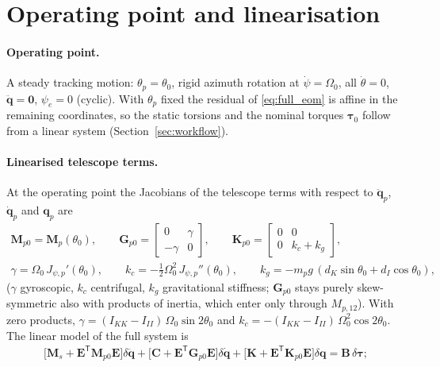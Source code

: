 \documentclass[10pt,a4paper]{article}
\numberwithin{equation}{section}
\begin{document}
\section{Operating point and linearisation}\label{sec:linear}
\paragraph{Operating point.} A steady tracking motion: $\theta_p = \theta_0$, rigid azimuth rotation at $\dot\psi = \Omega_0$, all $\dot\theta = 0$, $\ddot{\mathbf q} = \mathbf 0$, $\psi_e = 0$ (cyclic). With $\theta_p$ fixed the residual of \eqref{eq:full_eom} is affine in the remaining coordinates, so the static torsions and the nominal torques $\boldsymbol\tau_0$ follow from a linear system (Section~\ref{sec:workflow}).
\paragraph{Linearised telescope terms.} At the operating point the Jacobians of the telescope terms with respect to $\ddot{\mathbf q}_p$, $\dot{\mathbf q}_p$ and $\mathbf q_p$ are
\begin{gather}
\mathbf M_{p0} = \mathbf M_p(\theta_0),\qquad \mathbf G_{p0} = \begin{bmatrix}0 & \gamma\\ -\gamma & 0\end{bmatrix},\qquad \mathbf K_{p0} = \begin{bmatrix}0 & 0\\ 0 & k_c + k_g\end{bmatrix},\\
\gamma = \Omega_0\,J_{\psi,p}'(\theta_0),\qquad k_c = -\tfrac12\Omega_0^2\,J_{\psi,p}''(\theta_0),\qquad k_g = -m_p g\,(d_K\sin\theta_0 + d_I\cos\theta_0),
\end{gather}
($\gamma$ gyroscopic, $k_c$ centrifugal, $k_g$ gravitational stiffness; $\mathbf G_{p0}$ stays purely skew-symmetric also with products of inertia, which enter only through $M_{p,12}$). With zero products, $\gamma = (I_{KK}-I_{II})\,\Omega_0\sin2\theta_0$ and $k_c = -(I_{KK}-I_{II})\,\Omega_0^2\cos2\theta_0$. The linear model of the full system is
\begin{gather}
\bigl[\mathbf M_s + \mathbf E^{\mathsf T}\mathbf M_{p0}\mathbf E\bigr]\delta\ddot{\mathbf q} + \bigl[\mathbf C + \mathbf E^{\mathsf T}\mathbf G_{p0}\mathbf E\bigr]\delta\dot{\mathbf q} + \bigl[\mathbf K + \mathbf E^{\mathsf T}\mathbf K_{p0}\mathbf E\bigr]\delta\mathbf q = \mathbf B\,\delta\boldsymbol\tau;
\end{gather}
\end{document}
